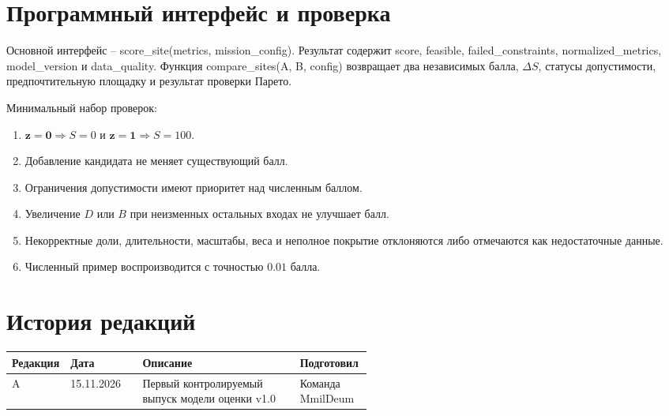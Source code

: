 \documentclass[10pt,a4paper]{article}
\newcommand{\code}[1]{{\ttfamily\small #1}}
\begin{document}
\newpage

\appendix
\section{Программный интерфейс и проверка}
Основной интерфейс -- \code{score\_site(metrics, mission\_config)}. Результат содержит \code{score}, \code{feasible}, \code{failed\_constraints}, \code{normalized\_metrics}, \code{model\_version} и \code{data\_quality}. Функция \code{compare\_sites(A, B, config)} возвращает два независимых балла, $\Delta S$, статусы допустимости, предпочтительную площадку и результат проверки Парето.

Минимальный набор проверок:
\begin{enumerate}
\item $\boldsymbol{z}=\boldsymbol{0}\Rightarrow S=0$ и $\boldsymbol{z}=\boldsymbol{1}\Rightarrow S=100$.
\item Добавление кандидата не меняет существующий балл.
\item Ограничения допустимости имеют приоритет над численным баллом.
\item Увеличение $D$ или $B$ при неизменных остальных входах не улучшает балл.
\item Некорректные доли, длительности, масштабы, веса и неполное покрытие отклоняются либо отмечаются как недостаточные данные.
\item Численный пример воспроизводится с точностью $0.01$ балла.
\end{enumerate}

\section*{История редакций}
\small
\begin{tabularx}{\linewidth}{@{}L{0.13\linewidth}L{0.20\linewidth}Y L{0.20\linewidth}@{}}
\toprule
\textbf{Редакция} & \textbf{Дата} & \textbf{Описание} & \textbf{Подготовил}\\
\midrule
A & 15.11.2026 & Первый контролируемый выпуск модели оценки v1.0 & Команда MmilDeum\\
\bottomrule
\end{tabularx}
\normalsize
\end{document}
